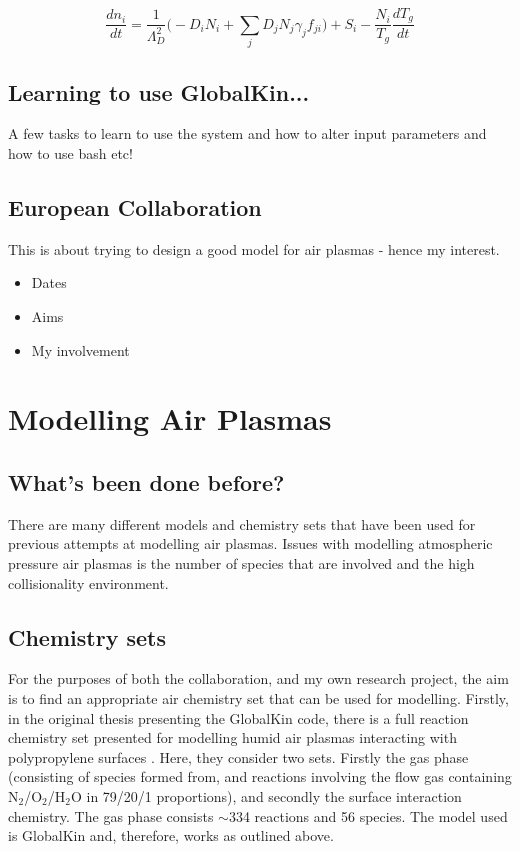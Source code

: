 \documentclass[11pt, oneside]{article}   	%
\begin{document}
\begin{itemize}
\begin{equation}
\frac{dn_i}{dt} = \frac{1}{\Lambda_D^2}\bigg(-D_iN_i + \sum_jD_jN_j\gamma_jf_{ji}\bigg) + S_i - \frac{N_i}{T_g}\frac{dT_g}{dt}
\end{equation}

\end{itemize}
\subsection{Learning to use GlobalKin...}
A few tasks to learn to use the system and how to alter input parameters and how to use bash etc! 

\subsection{European Collaboration}
This is about trying to design a good model for air plasmas - hence my interest.
\begin{itemize}
\item Dates
\item Aims
\item My involvement
\end{itemize}


\section{Modelling Air Plasmas}
\subsection{What's been done before?} 
There are many different models and chemistry sets that have been used for previous attempts at modelling air plasmas. 
Issues with modelling atmospheric pressure air plasmas is the number of species that are involved and the high collisionality environment.
\subsection{Chemistry sets}
For the purposes of both the collaboration, and my own research project, the aim is to find an appropriate air chemistry set that can be used for modelling.
Firstly, in the original thesis presenting the GlobalKin code, there is a full reaction chemistry set presented for modelling humid air plasmas interacting with polypropylene surfaces \cite{Dorai2002modeling}.
Here, they consider two sets.
Firstly the gas phase (consisting of species formed from, and reactions involving the flow gas containing N$_2$/O$_2$/H$_2$O in 79/20/1 proportions), and secondly the surface interaction chemistry. 
The gas phase consists $\sim$334 reactions and 56 species. 
The model used is GlobalKin and, therefore, works as outlined above.
\end{document}
